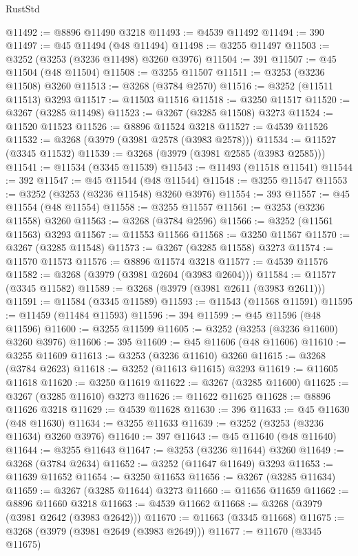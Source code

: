 \begin{lexlean}{RustStd}
\begin{coremodule}
{\begin{coremodule}
{{{{{{{{{{{{{{{{{{{{{{{{{{{{{{{{{{{{{{{@11492 := @8896 @11490 @3218
@11493 := @4539 @11492
@11494 := 390
@11497 := @45 @11494 (@48 @11494)
@11498 := @3255 @11497
@11503 := @3252 (@3253 (@3236 @11498) @3260 @3976)
@11504 := 391
@11507 := @45 @11504 (@48 @11504)
@11508 := @3255 @11507
@11511 := @3253 (@3236 @11508) @3260
@11513 := @3268 (@3784 @2570)
@11516 := @3252 (@11511 @11513) @3293
@11517 := @11503 @11516
@11518 := @3250 @11517
@11520 := @3267 (@3285 @11498)
@11523 := @3267 (@3285 @11508) @3273
@11524 := @11520 @11523
@11526 := @8896 @11524 @3218
@11527 := @4539 @11526
@11532 := @3268 (@3979 (@3981 @2578 (@3983 @2578)))
@11534 := @11527 (@3345 @11532)
@11539 := @3268 (@3979 (@3981 @2585 (@3983 @2585)))
@11541 := @11534 (@3345 @11539)
@11543 := @11493 (@11518 @11541)
@11544 := 392
@11547 := @45 @11544 (@48 @11544)
@11548 := @3255 @11547
@11553 := @3252 (@3253 (@3236 @11548) @3260 @3976)
@11554 := 393
@11557 := @45 @11554 (@48 @11554)
@11558 := @3255 @11557
@11561 := @3253 (@3236 @11558) @3260
@11563 := @3268 (@3784 @2596)
@11566 := @3252 (@11561 @11563) @3293
@11567 := @11553 @11566
@11568 := @3250 @11567
@11570 := @3267 (@3285 @11548)
@11573 := @3267 (@3285 @11558) @3273
@11574 := @11570 @11573
@11576 := @8896 @11574 @3218
@11577 := @4539 @11576
@11582 := @3268 (@3979 (@3981 @2604 (@3983 @2604)))
@11584 := @11577 (@3345 @11582)
@11589 := @3268 (@3979 (@3981 @2611 (@3983 @2611)))
@11591 := @11584 (@3345 @11589)
@11593 := @11543 (@11568 @11591)
@11595 := @11459 (@11484 @11593)
@11596 := 394
@11599 := @45 @11596 (@48 @11596)
@11600 := @3255 @11599
@11605 := @3252 (@3253 (@3236 @11600) @3260 @3976)
@11606 := 395
@11609 := @45 @11606 (@48 @11606)
@11610 := @3255 @11609
@11613 := @3253 (@3236 @11610) @3260
@11615 := @3268 (@3784 @2623)
@11618 := @3252 (@11613 @11615) @3293
@11619 := @11605 @11618
@11620 := @3250 @11619
@11622 := @3267 (@3285 @11600)
@11625 := @3267 (@3285 @11610) @3273
@11626 := @11622 @11625
@11628 := @8896 @11626 @3218
@11629 := @4539 @11628
@11630 := 396
@11633 := @45 @11630 (@48 @11630)
@11634 := @3255 @11633
@11639 := @3252 (@3253 (@3236 @11634) @3260 @3976)
@11640 := 397
@11643 := @45 @11640 (@48 @11640)
@11644 := @3255 @11643
@11647 := @3253 (@3236 @11644) @3260
@11649 := @3268 (@3784 @2634)
@11652 := @3252 (@11647 @11649) @3293
@11653 := @11639 @11652
@11654 := @3250 @11653
@11656 := @3267 (@3285 @11634)
@11659 := @3267 (@3285 @11644) @3273
@11660 := @11656 @11659
@11662 := @8896 @11660 @3218
@11663 := @4539 @11662
@11668 := @3268 (@3979 (@3981 @2642 (@3983 @2642)))
@11670 := @11663 (@3345 @11668)
@11675 := @3268 (@3979 (@3981 @2649 (@3983 @2649)))
@11677 := @11670 (@3345 @11675)
}}}}}}}}}}}}}}}}}}}}}}}}}}}}}}}}}}}}}}}
\end{coremodule}}
\end{coremodule}
\end{lexlean}
